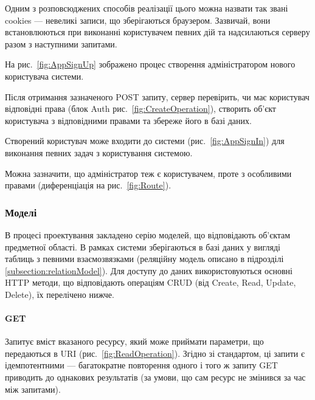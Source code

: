 Одним з розповсюджених способів реалізації цього можна назвати так звані cookies — невеликі записи, що зберігаються браузером. Зазвичай, вони встановлюються при виконанні користувачем певних дій та надсилаються серверу разом з наступними запитами. 

На рис.~\ref{fig:AppSignUp} зображено процес створення адміністратором нового користувача системи.


Після отримання зазначеного POST запиту, сервер перевірить, чи має користувач відповідні права (блок Auth рис.~\ref{fig:CreateOperation}), створить об’єкт користувача з відповідними правами та збереже його в базі даних.

Створений користувач може входити до системи (рис.~\ref{fig:AppSignIn}) для виконання певних задач з користування системою.


Можна зазначити, що адміністратор теж є користувачем, проте з особливими правами (диференціація на рис.~\ref{fig:Route}).

\subsubsection{Моделі}

В процесі проектування закладено серію моделей, що відповідають об’єктам предметної області. В рамках системи зберігаються в базі даних у вигляді таблиць з певними взаємозвязками (реляційну модель описано в підрозділі \ref{subsection:relationModel}). Для доступу до даних використовуються основні HTTP методи, що відповідають операціям CRUD (від Create, Read, Update, Delete), їх перелічено нижче.

\paragraph{GET}

Запитує вміст вказаного ресурсу, який може приймати параметри, що передаються в URI (рис.~\ref{fig:ReadOperation}). Згідно зі стандартом, ці запити є ідемпотентними — багатократне повторення одного і того ж запиту GET приводить до однакових результатів (за умови, що сам ресурс не змінився за час між запитами).

